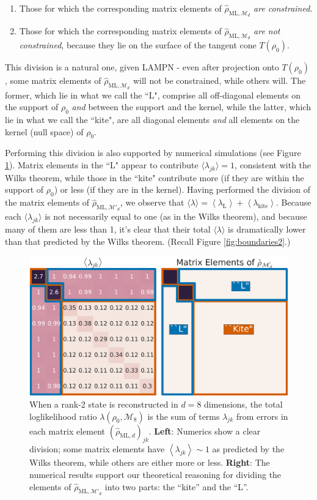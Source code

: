 \documentclass[aps,pra, twocolumn]{revtex4-1}
\newcommand{\M}{\mathcal{M}}
\newcommand{\expect}[1]{\ensuremath{\left\langle#1\right\rangle}}
\newcommand{\rhohat}{\hat{\rho}}
\newcommand{\rhoML}[1]{\rhohat_{\scriptscriptstyle{\mathrm{ML},#1}}}
\begin{document}
\begin{enumerate}[noitemsep]
\item Those for which the corresponding matrix elements of $\rhoML{\M_{d}}$ \emph{are constrained}.
\item Those for which the corresponding matrix elements of $\rhoML{\M_{d}}$ \emph{are not constrained}, because they lie on the surface of the tangent cone $T(\rho_{0})$.
\end{enumerate}
This division is a natural one, given LAMPN - even after projection onto $T(\rho_{0})$ , some matrix elements of $\rhoML{\M_{d}}$ will not be constrained, while others will. The former, which lie in what we call the ``L", comprise all off-diagonal elements on the support of $\rho_0$ \emph{and} between the support and the kernel, while the latter, which lie in what we call the ``kite", are all diagonal elements \emph{and} all elements on the kernel (null space) of $\rho_0$.

Performing this division is also supported by numerical simulations (see Figure \ref{fig:L}). Matrix elements in the ``L" appear to contribute $\langle \lambda_{jk}\rangle = 1$, consistent with the Wilks theorem, while those in the ``kite" contribute more (if they are within the support of $\rho_{0}$) or less (if they are in the kernel).  Having performed the division of the matrix elements of $\rhoML{\M'_{d}}$, we observe that $\langle\lambda\rangle = \expect{\lambda_{\mathrm{L}}} + \expect{\lambda_{\mathrm{kite}}}$. Because each $\langle \lambda_{jk}\rangle$ is not necessarily equal to one (as in the Wilks theorem), and because many of them are less than 1, it's clear that their total $\langle \lambda \rangle$ is dramatically lower than that predicted by the Wilks theorem. (Recall Figure \ref{fig:boundaries2}.)

\begin{figure}[h]
\includegraphics[width=\columnwidth]{Images/Figure_3.pdf}
 \caption{When a rank-2 state is reconstructed in $d=8$ dimensions, the total loglikelihood ratio $\lambda(\rho_0,\mathcal{M}_8)$ is the sum of terms $\lambda_{jk}$ from errors in each matrix element $(\rhoML{d})_{jk}$.  \textbf{Left}:  Numerics show a clear division; some matrix elements have $\expect{\lambda_{jk}}\sim1$ as predicted by the Wilks theorem, while others are either more or less. \textbf{Right}:  The numerical results support our theoretical reasoning for dividing the elements of $\rhoML{\M'_{d}}$ into two parts: the ``kite'' and the ``L''.}
\label{fig:L}
\end{figure}
\end{document}

